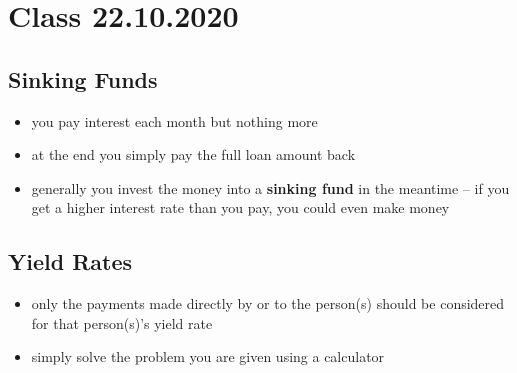\documentclass[../00_main.tex]{subfiles}
\begin{document}
\section{Class 22.10.2020}

\subsection{Sinking Funds}

\begin{itemize}
    \item you pay interest each month but nothing more
    \item at the end you simply pay the full loan amount back
    \item generally you invest the money into a \textbf{sinking fund} in the
        meantime -- if you get a higher interest rate than you pay, you could
        even make money
\end{itemize}

\subsection{Yield Rates}

\begin{itemize}
    \item only the payments made directly by or to the person(s) should be
        considered for that person(s)'s yield rate
    \item simply solve the problem you are given using a calculator
\end{itemize}
\end{document}
